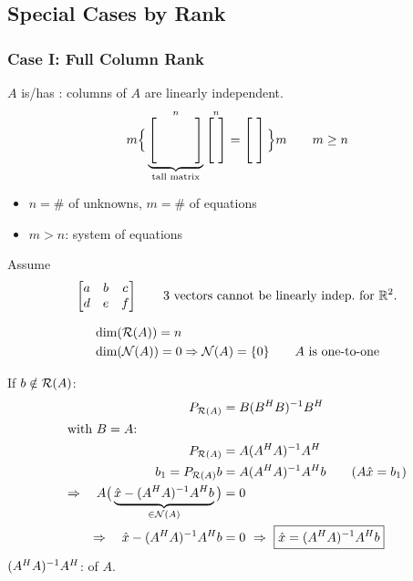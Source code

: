 \subsection{Special Cases by Rank}\label{ss:rank-cases}
\subsubsection{Case I: Full Column Rank}
$A$ is/has : columns of $A$ are linearly independent.
\[
m\Big\{\underbrace{\overset{n}{\bmat{\ &\ &\ \\ \ &\ &\ \\ \ &\ &\ }}}_{\text{tall matrix}}
\overset{n}{\bmat{\ \\ \ \\ \ }}=\bmat{\ \\ \ \\ \ }\Big\}m \qquad m\geq n
\]
\begin{itemize}[nosep,leftmargin=1.5em]
\item $n=\#$ of unknowns, \quad $m=\#$ of equations
\item $m>n$:  system of equations
\end{itemize}
Assume
\[
\begin{bmatrix}a&b&c\\d&e&f\end{bmatrix}\qquad\text{3 vectors cannot be linearly indep.\ for }\mathbb{R}^2.
\]

\begin{align*}
&\dim(\mathcal{R}(A))=n\\
&\dim(\mathcal{N}(A))=0\Rightarrow \mathcal{N}(A)=\{0\} \qquad A\text{ is one-to-one}
\end{align*}

If $b\notin\mathcal{R}(A)$:
\begin{align*}
P_{\mathcal{R}(A)}&=B(B^{H} B)^{-1}B^{H}\\
\intertext{with $B=A$:}
P_{\mathcal{R}(A)}&=A(A^{H} A)^{-1}A^{H}\\
b_1=P_{\mathcal{R}(A)}b&=A(A^{H} A)^{-1}A^{H} b \qquad (A\hat{x}=b_1)\\
\Rightarrow\quad A\big(\underbrace{\hat{x}-(A^{H} A)^{-1}A^{H} b}_{\in\mathcal{N}(A)}\big)&=0\\
\Rightarrow\quad \hat{x}-(A^{H} A)^{-1}A^{H} b&=0
\ \Rightarrow\ \boxed{\hat{x}=(A^{H} A)^{-1}A^{H} b}
\end{align*}
$(A^{H} A)^{-1}A^{H}$:  of $A$.


